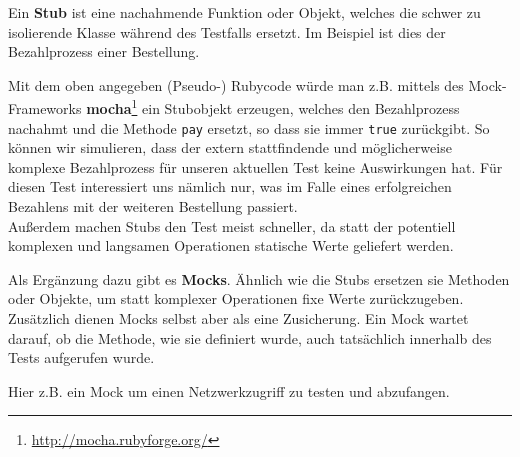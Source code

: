   Ein \textbf{Stub} ist eine nachahmende Funktion oder Objekt, welches die schwer zu isolierende Klasse während des Testfalls ersetzt. Im Beispiel ist dies der Bezahlprozess einer Bestellung.
%
%
%
%
\begin{ruby}[label=test\_bestellung.rb]
 

    

   
\end{ruby}

  Mit dem oben angegeben (Pseudo-) Rubycode würde man z.B. mittels des Mock-Frameworks \textbf{mocha}\footnote{\url{http://mocha.rubyforge.org/}} ein Stubobjekt erzeugen, welches den Bezahlprozess nachahmt und die Methode \texttt{pay} ersetzt, so dass sie immer \texttt{true} zurückgibt. So können wir simulieren, dass der extern stattfindende und möglicherweise komplexe Bezahlprozess für unseren aktuellen Test keine Auswirkungen hat. Für diesen Test interessiert uns nämlich nur, was im Falle eines erfolgreichen Bezahlens mit der weiteren Bestellung passiert.\\
  Außerdem machen Stubs den Test meist schneller, da statt der potentiell komplexen und langsamen Operationen statische Werte geliefert werden.

  Als Ergänzung dazu gibt es \textbf{Mocks}. Ähnlich wie die Stubs ersetzen sie Methoden oder Objekte, um statt komplexer Operationen fixe Werte zurückzugeben. Zusätzlich dienen Mocks selbst aber als eine Zusicherung. Ein Mock wartet darauf, ob die Methode, wie sie definiert wurde, auch tatsächlich innerhalb des Tests aufgerufen wurde.

  Hier z.B. ein Mock um einen Netzwerkzugriff zu testen und abzufangen.
%
%
\begin{ruby}[label=test\_http.rb]
 
\end{ruby}

